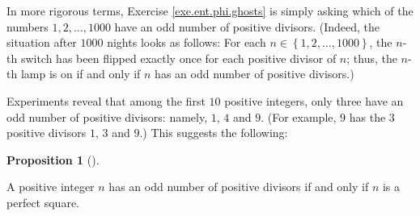 \documentclass[numbers=enddot,12pt,final,onecolumn,notitlepage]{scrartcl}%
\numberwithin{exer}{subsection}
\theoremstyle{definition}
\newtheorem{prop}[theo]{Proposition}
\newenvironment{proposition}[1][]
{\begin{prop}[#1]\begin{leftbar}}
{\end{leftbar}\end{prop}}
\begin{document}
In more rigorous terms, Exercise \ref{exe.ent.phi.ghosts} is simply asking
which of the numbers $1,2,\ldots,1000$ have an odd number of positive
divisors. (Indeed, the situation after $1000$ nights looks as follows: For
each $n\in\left\{  1,2,\ldots,1000\right\}  $, the $n$-th switch has been
flipped exactly once for each positive divisor of $n$; thus, the $n$-th lamp
is on if and only if $n$ has an odd number of positive divisors.)

Experiments reveal that among the first $10$ positive integers, only three
have an odd number of positive divisors: namely, $1$, $4$ and $9$. (For
example, $9$ has the $3$ positive divisors $1$, $3$ and $9$.) This suggests
the following:

\begin{proposition}
\label{prop.ent.phi.ghosts}A positive integer $n$ has an odd number of
positive divisors if and only if $n$ is a perfect square.
\end{proposition}
\end{document}
